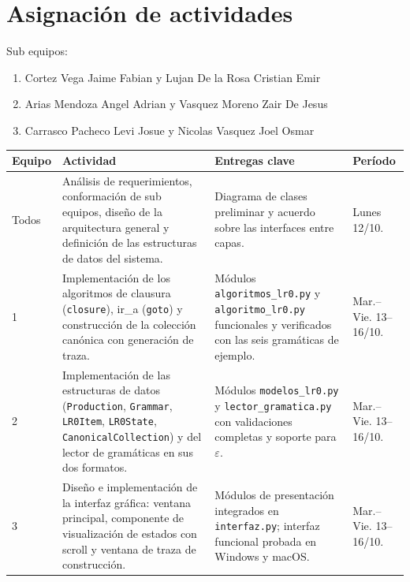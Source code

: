 \section{Asignación de actividades}

Sub equipos:
\begin{enumerate}
  \item Cortez Vega Jaime Fabian y Lujan De la Rosa Cristian Emir
  \item Arias Mendoza Angel Adrian y Vasquez Moreno Zair De Jesus
  \item Carrasco Pacheco Levi Josue y Nicolas Vasquez Joel Osmar
\end{enumerate}

\vspace{0.4cm}

\begin{longtable}{|P{1.6cm}|P{4.5cm}|P{4.8cm}|P{2.8cm}|}
\hline
{}
{\color{white}\textbf{Equipo}} &
{\color{white}\textbf{Actividad}} &
{\color{white}\textbf{Entregas clave}} &
{\color{white}\textbf{Período}} \\
\hline
\endhead

Todos &
Análisis de requerimientos, conformación de sub equipos, diseño de la arquitectura
general y definición de las estructuras de datos del sistema. &
Diagrama de clases preliminar y acuerdo sobre las interfaces entre capas. &
Lunes 12/10. \\
\hline

1 &
Implementación de los algoritmos de clausura (\texttt{closure}), ir\_a (\texttt{goto})
y construcción de la colección canónica con generación de traza. &
Módulos \texttt{algoritmos\_lr0.py} y \texttt{algoritmo\_lr0.py} funcionales y
verificados con las seis gramáticas de ejemplo. &
Mar.--Vie. 13--16/10. \\
\hline

2 &
Implementación de las estructuras de datos (\texttt{Production}, \texttt{Grammar},
\texttt{LR0Item}, \texttt{LR0State}, \texttt{CanonicalCollection}) y del lector de
gramáticas en sus dos formatos. &
Módulos \texttt{modelos\_lr0.py} y \texttt{lector\_gramatica.py} con validaciones
completas y soporte para $\varepsilon$. &
Mar.--Vie. 13--16/10. \\
\hline

3 &
Diseño e implementación de la interfaz gráfica: ventana principal, componente de
visualización de estados con scroll y ventana de traza de construcción. &
Módulos de presentación integrados en \texttt{interfaz.py}; interfaz funcional
probada en Windows y macOS. &
Mar.--Vie. 13--16/10. \\
\hline

\end{longtable}

